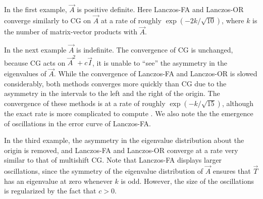 In the first example, $\vec{A}$ is positive definite.
Here Lanczos-FA and Lanczos-OR converge similarly to CG on $\vec{A}$ at a rate of roughly $\exp(-2k/\sqrt{10})$, where $k$ is the number of matrix-vector products with $\vec{A}$.

In the next example $\vec{A}$ is indefinite.
The convergence of CG is unchanged, because CG acts on $\vec{A}^2 + c\vec{I}$, it is unable to ``see'' the asymmetry in the eigenvalues of $\vec{A}$.
While the convergence of Lanczos-FA and Lanczos-OR is slowed considerably, both methods converges more quickly than CG due to the asymmetry in the intervals to the left and the right of the origin.
The convergence of these methods is at a rate of roughly $\exp(-k/\sqrt{15})$, although the exact rate is more complicated to compute \cite{fischer_96,schiefermayr_11}.
We also note the the emergence of oscillations in the error curve of Lanczos-FA.

In the third example, the asymmetry in the eigenvalue distribution about the origin is removed, and Lanczos-FA and Lanczos-OR converge at a rate very similar to that of multishift CG.
Note that Lanczos-FA displays larger oscillations, since the symmetry of the eigenvalue distribution of $\vec{A}$ ensures that $\vec{T}$ has an eigenvalue at zero whenever $k$ is odd.
However, the size of the oscillations is regularized by the fact that $c>0$.



